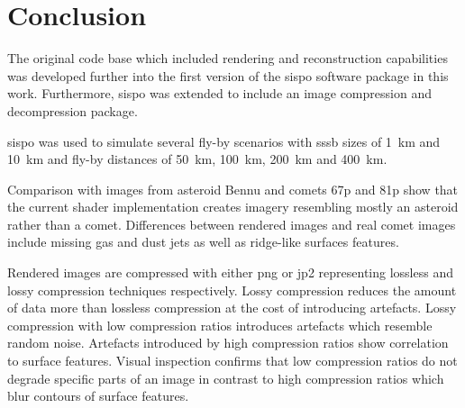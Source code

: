 \section{Conclusion} \label{sec:conclusion}
The original code base which included rendering and reconstruction capabilities was developed further into the first version of the \gls{sispo} software package in this work. Furthermore, \gls{sispo} was extended to include an image compression and decompression package.

\Gls{sispo} was used to simulate several fly-by scenarios with \gls{sssb} sizes of \SI{1}{\kilo\meter} and \SI{10}{\kilo\meter} and fly-by distances of \SI{50}{\kilo\meter}, \SI{100}{\kilo\meter}, \SI{200}{\kilo\meter} and \SI{400}{\kilo\meter}.

Comparison with images from asteroid Bennu and comets \gls{67p} and \gls{81p} show that the current shader implementation creates imagery resembling mostly an asteroid rather than a comet. Differences between rendered images and real comet images include missing gas and dust jets as well as ridge-like surfaces features.

Rendered images are compressed with either \gls{png} or \gls{jp2} representing lossless and lossy compression techniques respectively. Lossy compression reduces the amount of data more than lossless compression at the cost of introducing artefacts. Lossy compression with low compression ratios introduces artefacts which resemble random noise. Artefacts introduced by high compression ratios show correlation to surface features. Visual inspection confirms that low compression ratios do not degrade specific parts of an image in contrast to high compression ratios which blur contours of surface features.

